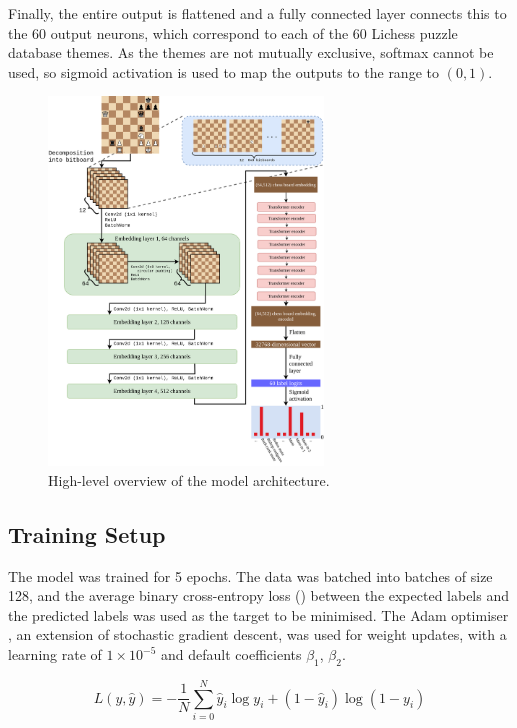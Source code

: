 Finally, the entire output is flattened and a fully connected layer connects
this to the 60 output neurons, which correspond to each of the 60 Lichess
puzzle database themes. As the themes are not mutually exclusive, softmax
cannot be used, so sigmoid activation is used to map the outputs to the range
to $(0, 1)$.

\begin{figure}[H]
  \centering
  \includegraphics[width=0.65\textwidth]{project/img/ml_diagram.png}
  \caption{High-level overview of the model architecture.}
  \label{MLDiagram}
\end{figure}

\subsection{Training Setup}\label{mlS23}

The model was trained for 5 epochs. The data was batched into batches of size
128, and the average binary cross-entropy loss () between the
expected labels and the predicted labels was used as the target to be
minimised. The Adam optimiser \citep{kingma2014adam}, an extension of
stochastic gradient descent, was used for weight updates, with a learning rate
of $1\times10^{-5}$ and default coefficients $\beta_1$, $\beta_2$.

\begin{equation}\label{bceEq}
  L(y, \hat{y}) = -\frac{1}{N}\sum_{i=0}^N \hat{y}_i \log y_i +
    (1-\hat{y}_i)\log(1-y_i)
\end{equation}

